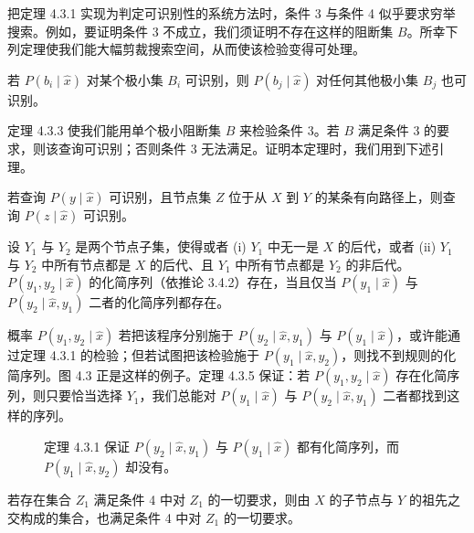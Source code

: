 把定理 4.3.1 实现为判定可识别性的系统方法时，条件 3 与条件 4 似乎要求穷举搜索。例如，要证明条件 3 不成立，我们须证明不存在这样的阻断集 $B$。所幸下列定理使我们能大幅剪裁搜索空间，从而使该检验变得可处理。

\begin{theorem}
若 $P(b_i\mid\hat{x})$ 对某个极小集 $B_i$ 可识别，则 $P(b_j\mid\hat{x})$ 对任何其他极小集 $B_j$ 也可识别。
\end{theorem}

定理 4.3.3 使我们能用单个极小阻断集 $B$ 来检验条件 3。若 $B$ 满足条件 3 的要求，则该查询可识别；否则条件 3 无法满足。证明本定理时，我们用到下述引理。

\begin{lemma}
若查询 $P(y\mid\hat{x})$ 可识别，且节点集 $Z$ 位于从 $X$ 到 $Y$ 的某条有向路径上，则查询 $P(z\mid\hat{x})$ 可识别。
\end{lemma}

\begin{theorem}
设 $Y_1$ 与 $Y_2$ 是两个节点子集，使得或者 (i) $Y_1$ 中无一是 $X$ 的后代，或者 (ii) $Y_1$ 与 $Y_2$ 中所有节点都是 $X$ 的后代、且 $Y_1$ 中所有节点都是 $Y_2$ 的非后代。$P(y_1,y_2\mid\hat{x})$ 的化简序列（依推论 3.4.2）存在，当且仅当 $P(y_1\mid\hat{x})$ 与 $P(y_2\mid\hat{x},y_1)$ 二者的化简序列都存在。
\end{theorem}

概率 $P(y_1,y_2\mid\hat{x})$ 若把该程序分别施于 $P(y_2\mid\hat{x},y_1)$ 与 $P(y_1\mid\hat{x})$，或许能通过定理 4.3.1 的检验；但若试图把该检验施于 $P(y_1\mid\hat{x},y_2)$，则找不到规则的化简序列。图 4.3 正是这样的例子。定理 4.3.5 保证：若 $P(y_1,y_2\mid\hat{x})$ 存在化简序列，则只要恰当选择 $Y_1$，我们总能对 $P(y_1\mid\hat{x})$ 与 $P(y_2\mid\hat{x},y_1)$ 二者都找到这样的序列。

\begin{figure}[htbp]
\centering
{}
\caption{定理 4.3.1 保证 $P(y_2\mid\hat{x},y_1)$ 与 $P(y_1\mid\hat{x})$ 都有化简序列，而 $P(y_1\mid\hat{x},y_2)$ 却没有。}
\label{fig:4.3}
\end{figure}

\begin{theorem}
若存在集合 $Z_1$ 满足条件 4 中对 $Z_1$ 的一切要求，则由 $X$ 的子节点与 $Y$ 的祖先之交构成的集合，也满足条件 4 中对 $Z_1$ 的一切要求。
\end{theorem}

